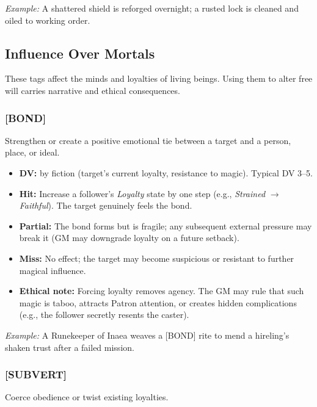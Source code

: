 \textit{Example:} A shattered shield is reforged overnight; a rusted lock is cleaned and oiled to working order.

\subsection{Influence Over Mortals}

These tags affect the minds and loyalties of living beings. Using them to alter free will carries narrative and ethical consequences.

\subsubsection{[BOND]}
Strengthen or create a positive emotional tie between a target and a person, place, or ideal.

\begin{itemize}
  \item \textbf{DV:} by fiction (target's current loyalty, resistance to magic). Typical DV 3--5.
  \item \textbf{Hit:} Increase a follower's \textit{Loyalty} state by one step (e.g., \textit{Strained} $\rightarrow$ \textit{Faithful}). The target genuinely feels the bond.
  \item \textbf{Partial:} The bond forms but is fragile; any subsequent external pressure may break it (GM may downgrade loyalty on a future setback).
  \item \textbf{Miss:} No effect; the target may become suspicious or resistant to further magical influence.
  \item \textbf{Ethical note:} Forcing loyalty removes agency. The GM may rule that such magic is taboo, attracts Patron attention, or creates hidden complications (e.g., the follower secretly resents the caster).
\end{itemize}

\textit{Example:} A Runekeeper of Inaea weaves a [BOND] rite to mend a hireling's shaken trust after a failed mission.

\subsubsection{[SUBVERT]}
Coerce obedience or twist existing loyalties.

